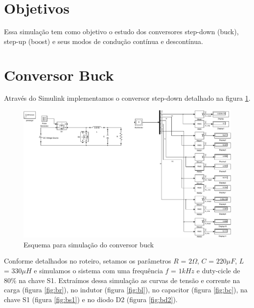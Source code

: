 \documentclass{article}
\begin{document}


\onehalfspacing
\section{Objetivos}
	Essa simulação tem como objetivo o estudo dos conversores step-down (buck), step-up (boost) e seus modos de condução contínua e descontínua.
	 
\section{Conversor Buck}
Através do Simulink implementamos o conversor step-down detalhado na figura \ref{fig:bsim}.
\begin{figure}[H]
	\centering
	\includegraphics[width=\linewidth]{matlab/buck/bsim}
	\caption{Esquema para simulação do conversor buck}
	\label{fig:bsim}
\end{figure}
Conforme detalhados no roteiro, setamos os parâmetros $R$ = $2\Omega$, $C$ = $220\mu F$, $L$ = $330\mu H$ e simulamos o sistema com uma frequência $f$ = $1kHz$ e duty-cicle de 80\% na chave S1.
Extraímos dessa simulação as curvas de tensão e corrente na carga (figura \ref{fig:br}), no indutor (figura \ref{fig:bl}), no capacitor (figura \ref{fig:bc}), na chave S1 (figura \ref{fig:bs1}) e no diodo D2 (figura \ref{fig:bd2}).
\end{document}
